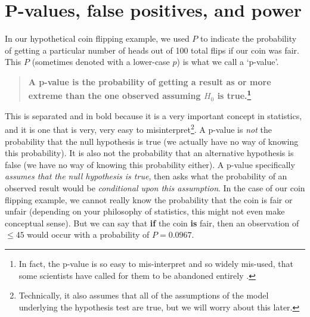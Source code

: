 \documentclass[
  openany]{scrbook}
\begin{document}
\hypertarget{p-values-false-positives-and-power}{%
\section{P-values, false positives, and power}\label{p-values-false-positives-and-power}}

In our hypothetical coin flipping example, we used \(P\) to indicate the probability of getting a particular number of heads out of 100 total flips if our coin was fair.
This \(P\) (sometimes denoted with a lower-case \(p\)) is what we call a `p-value'.

\begin{quote}
\textbf{A p-value is the probability of getting a result as or more extreme than the one observed assuming \(H_{0}\) is true.\footnote{In fact, the p-value is so easy to mis-interpret and so widely mis-used, that some scientists have called for them to be abandoned entirely \citetext{\citealp{Wasserstein2016}; \citealp[but see][]{Stanton-Geddes2014}; \citealp{Mayo2019}}.}}
\end{quote}

This is separated and in bold because it is a very important concept in statistics, and it is one that is very, very easy to misinterpret\footnote{Technically, it also assumes that all of the assumptions of the model underlying the hypothesis test are true, but we will worry about this later.}.
A p-value is \emph{not} the probability that the null hypothesis is true (we actually have no way of knowing this probability).
It is also not the probability that an alternative hypothesis is false (we have no way of knowing this probability either).
A p-value specifically \emph{assumes that the null hypothesis is true}, then asks what the probability of an observed result would be \emph{conditional upon this assumption}.
In the case of our coin flipping example, we cannot really know the probability that the coin is fair or unfair (depending on your philosophy of statistics, this might not even make conceptual sense).
But we can say that \textbf{if} the coin \textbf{is} fair, then an observation of \(\leq 45\) would occur with a probability of \(P = 0.0967\).
\end{document}

